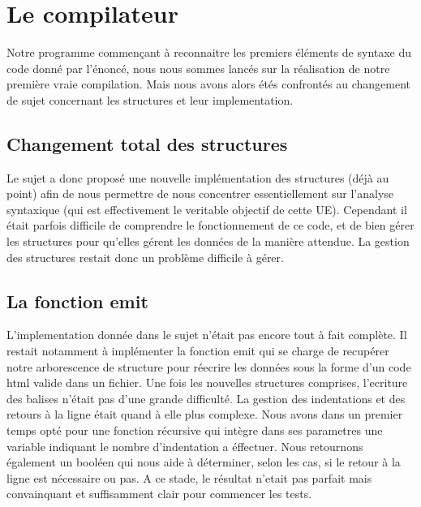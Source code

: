 \documentclass[12pt]{article}
\begin{document}
\newpage

\section{Le compilateur}

Notre programme commençant à reconnaitre les premiers éléments de syntaxe
du code donné par l'énoncé, nous nous sommes lancés sur la réalisation de notre
première vraie compilation.
\newline
\newline
Mais nous avons alors étés confrontés au changement de sujet concernant les structures
et leur implementation.

\subsection{Changement total des structures}

Le sujet a donc proposé une nouvelle implémentation des structures (déjà au point) afin de nous
permettre de nous concentrer essentiellement sur l'analyse syntaxique (qui est effectivement
le veritable objectif de cette UE). Cependant il était parfois difficile de comprendre
le fonctionnement de ce code, et de bien gérer les structures pour qu'elles gérent les données
de la manière attendue. La gestion des structures restait donc un problème difficile
à gérer.

\subsection{La fonction emit}

L'implementation donnée dans le sujet n'était pas encore tout à fait complète.
Il restait notamment à implémenter la fonction emit qui se charge de recupérer
notre arborescence de structure pour réecrire les données sous la forme d'un code
html valide dans un fichier.
\newline
\newline
Une fois les nouvelles structures comprises, l'ecriture des balises n'était pas
d'une grande difficulté. La gestion des indentations et des retours à la ligne
était quand à elle plus complexe. Nous avons dans un premier temps opté pour
une fonction récursive qui intègre dans ses parametres une variable indiquant
le nombre d'indentation a éffectuer. Nous retournons également un booléen qui
nous aide à déterminer, selon les cas, si le retour à la ligne est nécessaire ou pas.
\newline
A ce stade, le résultat n'etait pas parfait mais convainquant et suffisamment clair
pour commencer les tests.
\end{document}
